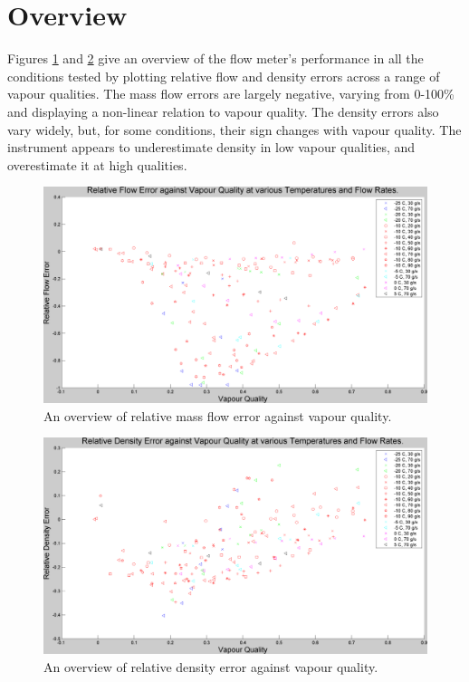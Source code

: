 \documentclass{report}
\begin{document}
\section{Overview}
\FloatBarrier
Figures \ref{plot:1} and \ref{plot:2} give an overview of the flow meter's performance in all the conditions tested by plotting relative flow and density errors across a range of vapour qualities. The mass flow errors are largely negative, varying from 0-100\% and displaying a non-linear relation to vapour quality. The density errors also vary widely, but, for some conditions, their sign changes with vapour quality. The instrument appears to underestimate density in low vapour qualities, and overestimate it at high qualities.\\
\begin{figure}
\includegraphics[width=\textwidth]{plots/fig1}
\caption{An overview of relative mass flow error against vapour quality.}
\label{plot:1}
\end{figure}
\begin{figure}
\includegraphics[width=\textwidth]{plots/fig2}
\caption{An overview of relative density error against vapour quality.}
\label{plot:2}
\end{figure}
\end{document}
